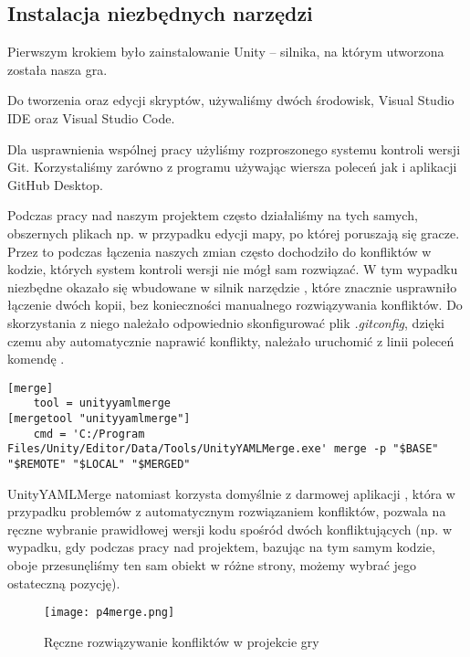 \subsection{Instalacja niezbędnych narzędzi}
Pierwszym krokiem było zainstalowanie Unity – silnika, na którym utworzona została nasza gra. 

Do tworzenia oraz edycji skryptów, używaliśmy dwóch środowisk, Visual Studio IDE oraz Visual Studio Code. 

Dla usprawnienia wspólnej pracy użyliśmy rozproszonego systemu kontroli wersji Git. Korzystaliśmy zarówno z programu używając wiersza poleceń jak i aplikacji GitHub Desktop.

Podczas pracy nad naszym projektem często działaliśmy na tych samych, obszernych plikach np. w przypadku edycji mapy, po której poruszają się gracze. 
Przez to podczas łączenia naszych zmian często dochodziło do konfliktów w kodzie, których system kontroli wersji nie mógł sam rozwiązać. 
W tym wypadku niezbędne okazało się wbudowane w silnik narzędzie , które znacznie usprawniło łączenie dwóch kopii, bez konieczności manualnego rozwiązywania konfliktów. Do skorzystania z niego należało odpowiednio skonfigurować plik \textit{.gitconfig}, dzięki czemu aby automatycznie naprawić konflikty, należało uruchomić z linii poleceń komendę .
\\
\begin{lstlisting}[caption={Zawartość pliku .gitconfig po konfiguracji narzędzia UnityYAMLMerge}]
[merge]
	tool = unityyamlmerge
[mergetool "unityyamlmerge"]
	cmd = 'C:/Program Files/Unity/Editor/Data/Tools/UnityYAMLMerge.exe' merge -p "$BASE" "$REMOTE" "$LOCAL" "$MERGED"
\end{lstlisting}

UnityYAMLMerge natomiast korzysta domyślnie z darmowej aplikacji , która w przypadku problemów z automatycznym rozwiązaniem konfliktów, pozwala na ręczne wybranie prawidłowej wersji kodu spośród dwóch konfliktujących (np. w wypadku, gdy podczas pracy nad projektem, bazując na tym samym kodzie, oboje przesunęliśmy ten sam obiekt w różne strony, możemy wybrać jego ostateczną pozycję).

\begin{figure}[H]
\texttt{[image: p4merge.png]}
\caption{Ręczne rozwiązywanie konfliktów w projekcie gry}
\end{figure}